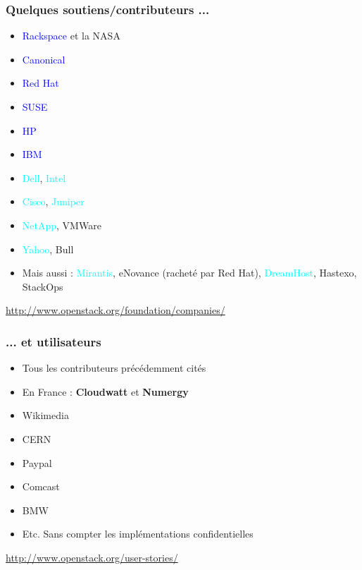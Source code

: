  \begin{frame}
    \frametitle{Quelques soutiens/contributeurs ...}
    \begin{itemize}
      \item \textcolor{blue}{Rackspace} et la NASA\pause
      \item \textcolor{blue}{Canonical}
      \item \textcolor{blue}{Red Hat}
      \item \textcolor{blue}{SUSE}\pause
      \item \textcolor{blue}{HP}
      \item \textcolor{blue}{IBM}
      \item \textcolor{cyan}{Dell}, \textcolor{cyan}{Intel}
      \item \textcolor{cyan}{Cisco}, \textcolor{cyan}{Juniper}\pause
      \item \textcolor{cyan}{NetApp}, VMWare\pause
      \item \textcolor{cyan}{Yahoo}, Bull\pause
      \item Mais aussi : \textcolor{cyan}{Mirantis}, eNovance (racheté par Red Hat), \textcolor{cyan}{DreamHost}, Hastexo, StackOps\pause
    \end{itemize}
    \url{http://www.openstack.org/foundation/companies/}
  \end{frame}

  \begin{frame}
    \frametitle{... et utilisateurs}
    \begin{itemize}
      \item Tous les contributeurs précédemment cités\pause
      \item En France : \textbf{Cloudwatt} et \textbf{Numergy}\pause
      \item Wikimedia
      \item CERN
      \item Paypal
      \item Comcast
      \item BMW\pause
      \item Etc. Sans compter les implémentations confidentielles
    \end{itemize}
    \url{http://www.openstack.org/user-stories/}
  \end{frame}


